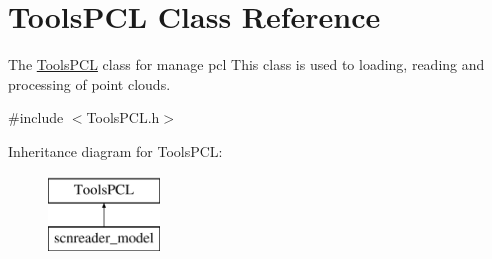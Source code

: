 \hypertarget{classToolsPCL}{\section{Tools\-P\-C\-L Class Reference}
\label{classToolsPCL}
}


The \hyperlink{classToolsPCL}{Tools\-P\-C\-L} class for manage pcl This class is used to loading, reading and processing of point clouds.  




{\ttfamily \#include $<$Tools\-P\-C\-L.\-h$>$}

Inheritance diagram for Tools\-P\-C\-L\-:\begin{figure}[H]
\begin{center}
\leavevmode
\includegraphics[height=2.000000cm]{classToolsPCL}
\end{center}
\end{figure}

